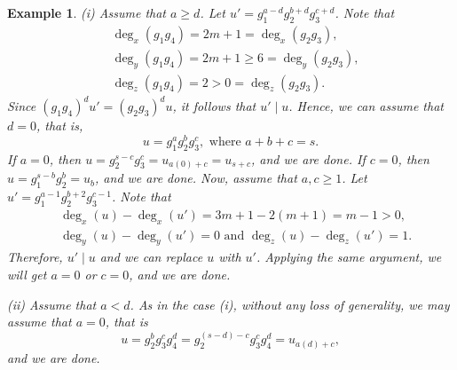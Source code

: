 \documentclass[11pt]{amsart}
\newtheorem{example}[theorem]{Example}
\begin{document}
\begin{example}
{(i) Assume that $a\geq d$. Let $u'=g_1^{a-d}g_2^{b+d}g_3^{c+d}$. Note that 
    \begin{align*}
    & \deg_x(g_1g_4)=2m+1 =\deg_x(g_2g_3),\\
		& \deg_y(g_1g_4)=2m+1\geq 6 =\deg_y(g_2g_3),\\
		& \deg_z(g_1g_4)=2>0=\deg_z(g_2g_3).
    \end{align*}
		Since $(g_1g_4)^{d}u' = (g_2g_3)^{d}u$, it follows that $u'\mid u$. Hence, we can assume that $d=0$, that is,
		$$u=g_1^ag_2^bg_3^c,\text{ where }a+b+c=s.$$
  	If $a=0$, then $u=g_2^{s-c}g_3^{c}=u_{a(0)+c}=u_{s+c}$, and we are done. 		
		If $c=0$, then $u=g_1^{s-b}g_2^{b}=u_b$, and we are done. 		
		Now, assume that $a,c\geq 1$. Let $u'=g_1^{a-1}g_2^{b+2}g_3^{c-1}$. Note that 
		\begin{align*}
		& \deg_x(u) - \deg_x(u') = 3m+1-2(m+1)=m-1 > 0,\\
		& \deg_y(u) - \deg_y(u') = 0\text{ and }\deg_z(u)-\deg_z(u')=1.
		\end{align*}
		Therefore, $u'\mid u$ and we can replace $u$ with $u'$. Applying the same argument, we will get $a=0$ or $c=0$, 
		and we are done.		
		
(ii) Assume that $a<d$. As in the case (i), without any loss of generality, we may assume that $a=0$, that is
     $$u=g_2^b g_3^c g_4^d = g_2^{(s-d)-c}g_3^{c}g_4^d = u_{a(d)+c},$$
		 and we are done.		         
		 
}
\end{example}
\end{document}
